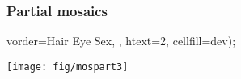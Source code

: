 \begin{frame}[fragile]
  \frametitle{Partial mosaics}
	  \vspace{1ex}

\begin{Input}[label=\fbox{\texttt{mospart3.sas}},baselinestretch=0.8,fontsize=\footnotesize]
    vorder=Hair Eye Sex, , 
    htext=2, cellfill=dev);
\end{Input}

\begin{center}
  \texttt{[image: fig/mospart3]}
\end{center}
\end{frame}

